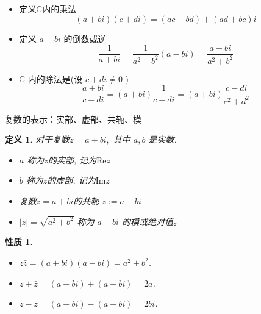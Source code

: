 \documentclass[13pt,fontset=mac]{ctexbeamer}
\newtheorem*{defi}{定义}
\newtheorem*{prop}{性质}
\begin{document}
\begin{frame}
	\begin{itemize}
		\item 定义$\mathbb{C}$内的乘法
		\[
		(a+b i)(c+d i) =(a c-b d)+(a d+b c) i
		\]

		\item 定义 $a+b {i}$ 的倒数或逆
		\[
		\frac{1}{a+b i}=\frac{1}{a^{2}+b^{2}}(a-b i)=\frac{a-b i}{a^{2}+b^{2}}
		\]
		\item  $\mathbb{C}$ 内的除法是(设 $c+d {i} \neq 0$ )
		\[
		\frac{a+b i}{c+d i}=(a+b i) \frac{1}{c+d i}=(a+b i) \frac{c-d i}{c^{2}+d^{2}}
		\]
	\end{itemize}
\end{frame}

\begin{frame}{复数的表示：实部、虚部、共轭、模}

	\begin{defi}
		对于复数$z=a+b i,$ 其中 $a, b$ 是实数.

		\begin{itemize}
			\item $a$ 称为$z$的\alert{实部}, 记为$\text{Re} z$

			\item $b$ 称为$z$的\alert{虚部}, 记为$\text{Im}  z$

			\item 复数$z=a+b i$的\alert{共轭} $\bar{z}:=a-bi$
			\item  $|z|=\sqrt{a^{2}+b^{2}}$ 称为 $a+b i$ 的\alert{模}或绝对值。
		\end{itemize}
	\end{defi}
	\begin{prop}
		\begin{itemize}
			\item $z  \bar{z}=(a+b i)(a-b i)=a^{2}+b^{2}$.
			\item $z+\bar{z}=(a+b i)+(a-b i)=2 a$.
			\item $z-\bar{z}=(a+b i)-(a-b i)=2 b i$.
		\end{itemize}
	\end{prop}
\end{frame}
\end{document}
